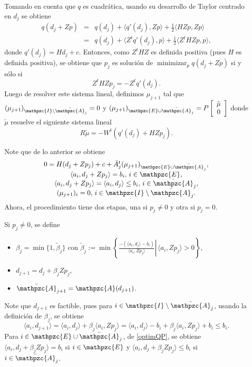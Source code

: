 \documentclass[a4paper,10pt]{book}
\newcommand{\cI}{\mathpzc{I}}
\newcommand{\cE}{\mathpzc{E}}
\newcommand{\cA}{\mathpzc{A}}
\newcommand{\la}{\langle}
\newcommand{\ra}{\rangle}
\begin{document}
Tomando en cuenta que $q$ es cuadrática, usando su desarrollo de Taylor centrado en $d_j$ se obtiene
\begin{eqnarray*}
 q(d_j+Z p) &=& q(d_j) + \la q'(d_j) , Z p\ra + \frac{1}{2} \la H Zp, Zp\ra \\
 &=& q(d_j) + \la Z^t q'(d_j) , p\ra +\frac{1}{2}\la Z^t H Zp,p\ra,
\end{eqnarray*}
donde $q'(d_j)=H d_j +c$. Entonces, como $Z^tHZ$ es definida positiva (pues $H$ es definida positiva), se obtiene que $p_j$ es solución de $\displaystyle \mathop{\mathrm{minimizar}}_p q(d_j+ Zp)$ si y sólo si
\[
 Z^tHZ p_j=-Z^tq'(d_j).
\]
Luego de resolver este sistema lineal, definimos $\mu_{j+1}$ tal que $(\mu_{j+1})_{\cI\setminus\bar\cA_j}=0$ y $(\mu_{j+1})_{\cE\cup\bar\cA_j}=P\left[\begin{array}{c}\tilde{\mu} \\ 0\end{array}\right]$ donde $\tilde\mu$ resuelve el siguiente sistema lineal
\[
 R\tilde\mu=-W^t(q'(d_j)+HZp_j).
\]

Note que de lo anterior se obtiene
\begin{equation}\label{optimQP}
\begin{array}{c}
0=H(d_j+Zp_j)+c+\bar A_j^t(\mu_{j+1})_{\cE\cup\bar\cA_j},\\
\la a_i,d_j+Zp_j\ra =b_i, \, i\in \cE,\\
\la a_i,d_j+Zp_j\ra = \la a_i,d_j\ra\leq b_i, \, i\in \bar\cA_j,\\
(\mu_{j+1})_i=0,\, i\in\cI\setminus\bar\cA_j.
\end{array}
\end{equation}
Ahora, el procedimiento tiene dos etapas, una si $p_j\neq 0$ y otra si $p_j=0$.

Si $p_j\neq0$, se define
\begin{itemize}
  \item $\beta_j=\min\{1,\tilde\beta_j\}$ con $\tilde\beta_j:=\displaystyle \min\left\{\left.\frac{-(\la a_i,d_j\ra-b_i)}{\la a_i,Zp_j\ra}\right| \, \la a_i,Zp_j\ra >0\right\}$,
 \item $d_{j+1}=d_j+\beta_j Zp_j$,
 \item $\bar\cA_{j+1}=\cA(d_{j+1})$.
\end{itemize}
Note que $d_{j+1}$ es factible, pues para $i\in \cI\setminus\bar\cA_j$, usando la definición de $\beta_j$, se obtiene
\[
 \la a_i,d_{j+1}\ra=\la a_i,d_j\ra +\beta_j\la a_i,Zp_j\ra =\la a_i,d_j\ra-b_i+\beta_j\la a_i,Zp_j\ra+b_i\leq b_i.
\]
Para $i\in\cE\cup\bar\cA_j$, de \eqref{optimQP}, se obtiene $\la a_i,d_j+\beta_jZp_j\ra =b_i$ si $i\in \cE$ y $\la a_i,d_j+\beta_j Zp_j\ra \leq b_i$ si $i\in \bar\cA_j$.
\end{document}
